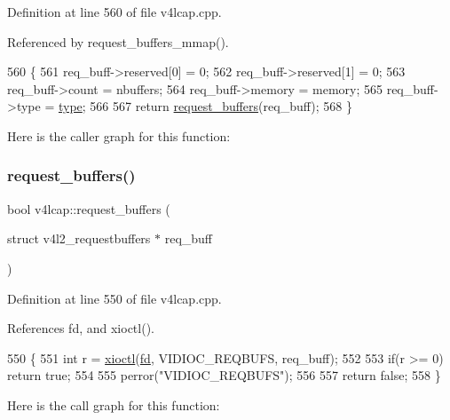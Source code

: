 Definition at line 560 of file v4lcap.\+cpp.



Referenced by request\+\_\+buffers\+\_\+mmap().


\begin{DoxyCode}
560                                                                                                            
                             \{
561     req\_buff->reserved[0] = 0;
562     req\_buff->reserved[1] = 0;
563     req\_buff->count = nbuffers;
564     req\_buff->memory = memory;
565     req\_buff->type = \hyperlink{classstd_1_1conditional_1_1type}{type};
566 
567     \textcolor{keywordflow}{return} \hyperlink{classv4lcap_adfe2c7d6382e325a9f4e1ad699c01fc5}{request\_buffers}(req\_buff);
568 \}
\end{DoxyCode}
Here is the caller graph for this function\+:
\mbox{\label{classv4lcap_a84e43b6054a1d84002c1d060aef1bf84}} 
\subsubsection{\texorpdfstring{request\+\_\+buffers()}{request\_buffers()}\hspace{0.1cm}{\footnotesize\ttfamily [2/2]}}
{\footnotesize\ttfamily bool v4lcap\+::request\+\_\+buffers (\begin{DoxyParamCaption}\item[{struct v4l2\+\_\+requestbuffers $\ast$}]{req\+\_\+buff }\end{DoxyParamCaption})}



Definition at line 550 of file v4lcap.\+cpp.



References fd, and xioctl().


\begin{DoxyCode}
550                                                                   \{
551     \textcolor{keywordtype}{int} r = \hyperlink{classv4lcap_ab5aaa5a8c0df17f5ca57e0b5170232cb}{xioctl}(\hyperlink{classv4lcap_a38109593bde997dad13b3a461569573d}{fd}, VIDIOC\_REQBUFS, req\_buff);
552 
553     \textcolor{keywordflow}{if}(r >= 0) \textcolor{keywordflow}{return} \textcolor{keyword}{true};
554 
555     perror(\textcolor{stringliteral}{"VIDIOC\_REQBUFS"});
556 
557     \textcolor{keywordflow}{return} \textcolor{keyword}{false};
558 \}
\end{DoxyCode}
Here is the call graph for this function\+:
\mbox{\label{classv4lcap_a874905b9c6c785294fa7487a844cb841}} 

